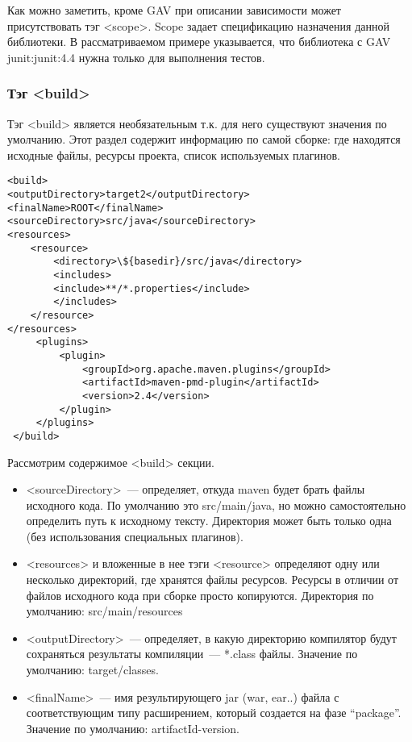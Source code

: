 Как можно заметить, кроме GAV при описании зависимости может присутствовать тэг <scope>. Scope задает спецификацию назначения данной библиотеки. В рассматриваемом примере указывается, что библиотека с GAV junit:junit:4.4 нужна только для выполнения тестов.

\subsubsection{Тэг <build>}
Тэг <build> является необязательным т.к. для него существуют значения по умолчанию. Этот раздел содержит информацию по самой сборке: где находятся исходные файлы, ресурсы проекта, список используемых плагинов.

\begin{lstlisting}
<build>
<outputDirectory>target2</outputDirectory>
<finalName>ROOT</finalName>
<sourceDirectory>src/java</sourceDirectory>
<resources>
    <resource>
        <directory>\${basedir}/src/java</directory>
        <includes>
        <include>**/*.properties</include>
        </includes>
    </resource>
</resources>
     <plugins>
         <plugin>
             <groupId>org.apache.maven.plugins</groupId>
             <artifactId>maven-pmd-plugin</artifactId>
             <version>2.4</version>
         </plugin>
     </plugins>
 </build>
\end{lstlisting}

Рассмотрим содержимое <build> секции.

\begin{itemize}
\item <sourceDirectory>~--- определяет, откуда maven будет брать файлы исходного кода. По умолчанию это src/main/java, но можно самостоятельно определить путь к исходному тексту. Директория может быть только одна (без использования специальных плагинов).
\item <resources> и вложенные в нее тэги <resource> определяют одну или несколько директорий, где хранятся файлы ресурсов. Ресурсы в отличии от файлов исходного кода при сборке просто копируются. Директория по умолчанию: src/main/resources 
\item <outputDirectory>~--- определяет, в какую директорию компилятор будут сохраняться результаты компиляции~--- *.class файлы. Значение по умолчанию: target/classes.
\item <finalName>~--- имя результирующего jar (war, ear..) файла с соответствующим типу расширением, который создается на фазе “package”. Значение по умолчанию: artifactId-version.
\end{itemize}

